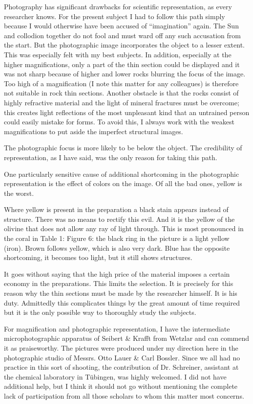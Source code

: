 \documentclass[a4paper, 12pt, oneside]{article}
\begin{document}
Photography has significant drawbacks for scientific representation, as every researcher knows. For the present subject I had to follow this path simply because I would otherwise have been accused of ``imagination'' again. The Sun and collodion together do not fool and must ward off any such accusation from the start. But the photographic image incorporates the object to a lesser extent. This was especially felt with my best subjects. In addition, especially at the higher magnifications, only a part of the thin section could be displayed and it was not sharp because of higher and lower rocks blurring the focus of the image. Too high of a magnification (I note this matter for any colleagues) is therefore not suitable in rock thin sections. Another obstacle is that the rocks consist of highly refractive material and the light of mineral fractures must be overcome; this creates light reflections of the most unpleasant kind that an untrained person could easily mistake for forms. To avoid this, I always work with the weakest magnifications to put aside the imperfect structural images.

The photographic focus is more likely to be below the object. The credibility of representation, as I have said, was the only reason for taking this path.

One particularly sensitive cause of additional shortcoming in the photographic representation is the effect of colors on the image. Of all the bad ones, yellow is the worst.

Where yellow is present in the preparation a black stain appears instead of structure. There was no means to rectify this evil. And it is the yellow of the olivine that does not allow any ray of light through. This is most pronounced in the coral in Table 1: Figure 6: the black ring in the picture is a light yellow (iron). Brown follows yellow, which is also very dark. Blue has the opposite shortcoming, it becomes too light, but it still shows structures.

It goes without saying that the high price of the material imposes a certain economy in the preparations. This limits the selection. It is precisely for this reason why the thin sections must be made by the researcher himself. It is his duty. Admittedly this complicates things by the great amount of time required but it is the only possible way to thoroughly study the subjects.

For magnification and photographic representation, I have the intermediate microphotographic apparatus of Seibert \& Krafft from Wetzlar and can commend it as praiseworthy. The pictures were produced under my direction here in the photographic studio of Messrs. Otto Lauer \& Carl Bossler. Since we all had no practice in this sort of shooting, the contribution of Dr. Schreiner, assistant at the chemical laboratory in Tübingen, was highly welcomed. I did not have additional help, but I think it should not go without mentioning the complete lack of participation from all those scholars to whom this matter most concerns.
\end{document}

